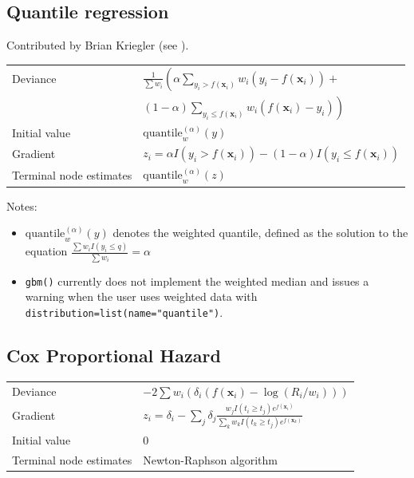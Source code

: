 \documentclass{article}
\begin{document}
\subsection{Quantile regression}

Contributed by Brian Kriegler (see \cite{Kriegler:2010}).

\begin{tabular}{ll} Deviance & $\frac{1}{\sum w_i}
   \left(\alpha\sum_{y_i>f(\mathbf{x}_i)} w_i(y_i-f(\mathbf{x}_i))\right. +$ \\
         & \hspace{0.5in}$\left.(1-\alpha)\sum_{y_i\leq f(\mathbf{x}_i)} w_i(f(\mathbf{x}_i)-y_i)\right)$ \\
Initial value & $\mathrm{quantile}^{(\alpha)}_w(y)$ \\ Gradient & $z_i=\alpha I(y_i>f(\mathbf{x}_i))-(1-\alpha)I(y_i\leq f(\mathbf{x}_i))$ \\ Terminal node estimates & $\mathrm{quantile}^{(\alpha)}_w(z)$ \end{tabular}

Notes: \begin{itemize} \item $\mathrm{quantile}^{(\alpha)}_w(y)$ denotes the weighted quantile, defined as the solution to the equation $\frac{\sum w_iI(y_i\leq q)}{\sum w_i}=\alpha$ \item \texttt{gbm()} currently does not implement the weighted median and issues a warning when the user uses weighted data with \texttt{distribution=list(name="quantile")}. \end{itemize}


\subsection{Cox Proportional Hazard}

\begin{tabular}{ll} Deviance & $-2\sum w_i(\delta_i(f(\mathbf{x}_i)-\log(R_i/w_i)))$\\ Gradient & $\displaystyle z_i=\delta_i - \sum_j \delta_j
            \frac{w_jI(t_i\geq t_j)e^{f(\mathbf{x}_i)}}
                 {\sum_k w_kI(t_k\geq t_j)e^{f(\mathbf{x}_k)}}$ \\
Initial value & 0 \\ Terminal node estimates & Newton-Raphson algorithm \end{tabular}
\end{document}
